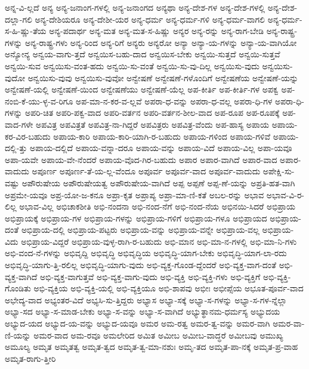 {ಅನ್ನ-ವಿ-ಲ್ಲದೆ
ಅನ್ಯ
ಅನ್ಯ-ಜನಾಂಗ-ಗಳಲ್ಲಿ
ಅನ್ಯ-ಜನಾಂಗದ
ಅನ್ಯಥಾ
ಅನ್ಯ-ದೇಶ-ಗಳ
ಅನ್ಯ-ದೇಶ-ಗಳಲ್ಲಿ
ಅನ್ಯ-ದೇಶ-ದಲ್ಲಾ-ಗಲಿ
ಅನ್ಯ-ದೇಶಿಯರೂ
ಅನ್ಯ-ದೇಶೀ-ಯರ
ಅನ್ಯ-ಧರ್ಮ
ಅನ್ಯ-ಧರ್ಮ-ಗಳಿ
ಅನ್ಯ-ಧರ್ಮ-ವಾಗಲಿ
ಅನ್ಯ-ಧರ್ಮ-ಸ-ಹಿ-ಷ್ಣು-ತೆಯ
ಅನ್ಯ-ಪದಾರ್ಥ
ಅನ್ಯ-ಮತ
ಅನ್ಯ-ಮತ-ಸ-ಹಿಷ್ಣು
ಅನ್ಯರ
ಅನ್ಯ-ರನ್ನು
ಅನ್ಯ-ರಾಗ-ಬೇಡಿ
ಅನ್ಯ-ರಾಷ್ಟ್ರ-ಗಳನ್ನು
ಅನ್ಯ-ರಾಷ್ಟ್ರ-ಗಳು
ಅನ್ಯ-ರಿಂದ
ಅನ್ಯ-ರಿಗೆ
ಅನ್ಯರು
ಅನ್ಯರೋ
ಅನ್ಯಾ
ಅನ್ಯಾ-ಯ-ಗಳನ್ನು
ಅನ್ಯಾ-ಯ-ವಾಗಿಯೋ
ಅನ್ಯೋನ್ಯ
ಅನ್ವಯ-ವಾಗು-ತ್ತದೆ
ಅನ್ವಯಿಸ-ಬಹು-ದಾದ
ಅನ್ವಯಿಸ-ಬೇಕು
ಅನ್ವಯಿ-ಸುತ್ತದೆ
ಅನ್ವಯಿ-ಸುತ್ತವೆ
ಅನ್ವಯಿ-ಸುವ
ಅನ್ವಯಿಸು-ವಂತ-ಹದು
ಅನ್ವಯಿ-ಸು-ವಂತೆ
ಅನ್ವಯಿ-ಸು-ವು-ದಿಲ್ಲ
ಅನ್ವಯಿಸು-ವುದು
ಅನ್ವಯಿಸು-ವುದೋ
ಅನ್ವಯಿಸು-ವುವು
ಅನ್ವಯಿಸು-ವುವೋ
ಅನ್ವೇಷಣೆ
ಅನ್ವೇಷಣೆ-ಗಳೊಂದಿಗೆ
ಅನ್ವೇಷಣೆಯ
ಅನ್ವೇಷಣೆ-ಯನ್ನು
ಅನ್ವೇಷಣೆ-ಯಲ್ಲಿ
ಅನ್ವೇಷಣೆ-ಯಿಂದ
ಅನ್ವೇಷಣೆಯು
ಅನ್ವೇಷಣೆ-ಯೆಲ್ಲ
ಅಪ-ಕೀರ್ತಿ
ಅಪ-ಕೀರ್ತಿ-ಗಳ
ಅಪಕ್ವ
ಅಪ-ನಂಬಿ-ಕೆ-ಯು-ಳ್ಳ-ವ-ರಿಗೂ
ಅಪ-ಮಾ-ನ-ಕರ-ವ-ಲ್ಲವೆ
ಅಪರಾ-ಧ-ವನ್ನು
ಅಪರಾ-ಧ-ವಲ್ಲ
ಅಪರಾ-ಧಿ-ಗಳ
ಅಪರಾ-ಧಿ-ಗಳನ್ನು
ಅಪರಿ-ಚಿತ
ಅಪರಿ-ಪಕ್ವ-ವಾದ
ಅಪರಿ-ವರ್ತನ
ಅಪರಿ-ವರ್ತನ-ಶೀಲ-ವಾದ
ಅಪ-ರೂಪ
ಅಪ-ರೂಪಕ್ಕೆ
ಅಪ-ವಾದ-ಗಳೇ
ಅಪವಿತ್ರ
ಅಪವಿತ್ರತೆ
ಅಪವಿತ್ರ-ನಾ-ಗಿದ್ದರೆ
ಅಪವಿತ್ರರು
ಅಪವಿತ್ರ-ವೆಂದು
ಅಪ-ಹಾಸ್ಯ
ಅಪಾಯ
ಅಪಾಯ-ಕರ-ವಿರ-ಬಹುದು
ಅಪಾಯ-ಕಾರಿ
ಅಪಾಯ-ಕಾರಿ-ಯಾಗಿ-ರ-ಬಹುದು
ಅಪಾಯ-ಗಳಿಂದ
ಅಪಾಯ-ಗಳಿವೆ
ಅಪಾಯ-ದಲ್ಲಿ-ತ್ತು
ಅಪಾಯ-ದಲ್ಲಿದೆ
ಅಪಾಯ-ವನ್ನಾ-ದರೂ
ಅಪಾಯ-ವನ್ನು
ಅಪಾಯ-ವಿದೆ
ಅಪಾಯ-ವಿಲ್ಲ
ಅಪಾ-ಯವೂ
ಅಪಾ-ಯವೇ
ಅಪಾಯ-ವೇ-ನೆಂದರೆ
ಅಪಾಯ-ವೊದ-ಗಿರ-ಬಹುದು
ಅಪಾರ
ಅಪಾರ-ವಾಗಿದೆ
ಅಪಾರ-ವಾದ
ಅಪಾರ-ವಾದುದು
ಅಪೂರ್ಣ
ಅಪೂರ್ಣ-ತೆ-ಯ-ಲ್ಲ-ವೆಂದೂ
ಅಪೂರ್ವ
ಅಪೂರ್ವ-ವಾದ
ಅಪೂರ್ವ-ವಾದುದು
ಅಪೇಕ್ಷಿ-ಸು-ವಷ್ಟು
ಅಪೌರುಷೇಯ
ಅಪೌರುಷೇಯತ್ವ
ಅಪೌರುಷೇಯ-ವಾಗಿದೆ
ಅಪ್ಪ
ಅಪ್ಪಣೆ
ಅಪ್ಪ-ಣೆ-ಯನ್ನು
ಅಪ್ರತಿ-ಹತ-ವಾಗಿ
ಅಪ್ರಮೇ-ಯವೂ
ಅಪ್ರ-ಯೋ-ಜ-ಕನೂ
ಅಪ್ರಾ-ಕೃತ
ಅಪ್ರಾಪ್ಯ
ಅಪ್ರಾ-ಮಾ-ಣಿ-ಕತೆ
ಅಬಲ-ರನ್ನು
ಅಭಾವ
ಅಭಾವ-ವಿ-ರ-ಲಿಲ್ಲ
ಅಭಾವ-ವಿಲ್ಲ
ಅಭಿಚಾಕಶೀತಿ
ಅಭಿ-ನಂದನಾ
ಅಭಿ-ನಂದ-ನೆಗೆ
ಅಭಿ-ನಂದ-ನೆಯ
ಅಭಿನಯಿ-ಸಿದರೆ
ಅಭಿಪ್ರಾಯ
ಅಭಿಪ್ರಾಯಕ್ಕೆ
ಅಭಿಪ್ರಾಯ-ಗಳ
ಅಭಿಪ್ರಾಯ-ಗಳನ್ನು
ಅಭಿಪ್ರಾಯ-ಗಳಿಗೆ
ಅಭಿಪ್ರಾಯ-ಗಳೂ
ಅಭಿಪ್ರಾಯದ
ಅಭಿಪ್ರಾಯ-ದಂತೆ
ಅಭಿಪ್ರಾಯ-ದಲ್ಲಿ
ಅಭಿಪ್ರಾಯ-ಪಟ್ಟರು
ಅಭಿಪ್ರಾಯ-ವನ್ನು
ಅಭಿಪ್ರಾಯ-ವನ್ನೇ
ಅಭಿಪ್ರಾಯ-ವಲ್ಲ
ಅಭಿಪ್ರಾಯ-ವಿದು
ಅಭಿಪ್ರಾಯ-ವಿದ್ದರೆ
ಅಭಿಪ್ರಾಯ-ವುಳ್ಳ-ರಾಗಿ-ರ-ಬಹುದು
ಅಭಿ-ಮಾನ
ಅಭಿ-ಮಾ-ನ-ಗಳಲ್ಲಿ
ಅಭಿ-ಮಾ-ನಿ-ಗಳು
ಅಭಿ-ವಂದ-ನೆ-ಗಳನ್ನು
ಅಭಿವೃದ್ದಿ
ಅಭಿವೃದ್ಧಿ
ಅಭಿವೃದ್ಧಿಯ
ಅಭಿವೃದ್ಧಿ-ಯಾಗ-ಬೇಕು
ಅಭಿವೃದ್ಧಿ-ಯಾಗ-ಲಾ-ರದು
ಅಭಿವೃದ್ಧಿ-ಯಾಗು-ತ್ತಿ-ರಲಿಲ್ಲ
ಅಭಿವೃದ್ಧಿ-ಯಾಗು-ವುದು
ಅಭಿ-ವ್ಯಕ್ತ-ಗೊಂಡ-ದ್ದೆಂದರೆ
ಅಭಿ-ವ್ಯಕ್ತ-ವಾಗ-ದಂತೆ
ಅಭಿ-ವ್ಯಕ್ತ-ವಾಗಿದೆ
ಅಭಿ-ವ್ಯಕ್ತ-ವಾಗುತ್ತವೆ
ಅಭಿ-ವ್ಯಕ್ತ-ವಾಗು-ವುದು
ಅಭಿ-ವ್ಯಕ್ತಿ
ಅಭಿ-ವ್ಯಕ್ತಿ-ಗಳು
ಅಭಿ-ವ್ಯಕ್ತಿಗೆ
ಅಭಿ-ವ್ಯಕ್ತಿ-ಗೊಂಡಿತು
ಅಭಿ-ವ್ಯಕ್ತಿಯ
ಅಭಿ-ವ್ಯಕ್ತಿ-ಯಲ್ಲಿ
ಅಭಿ-ವ್ಯಕ್ತಿಯೂ
ಅಭಿ-ಶಾಪವು
ಅಭೀಃ
ಅಭೀಪ್ಸೆಯ
ಅಭೂತ-ಪೂರ್ವ-ವಾದ
ಅಭೇದ್ಯ-ವಾದ
ಅಭ್ಯಂತರ-ವಿದೆ
ಅಭ್ಯಸಿ-ಸು-ತ್ತಿದ್ದರು
ಅಭ್ಯಾಸ
ಅಭ್ಯಾ-ಸಕ್ಕೆ
ಅಭ್ಯಾ-ಸ-ಗಳನ್ನು
ಅಭ್ಯಾ-ಸ-ಗಳ-ನ್ನೆಲ್ಲಾ
ಅಭ್ಯಾ-ಸದ
ಅಭ್ಯಾ-ಸ-ಮಾಡ-ಬೇಕು
ಅಭ್ಯಾ-ಸ-ವನ್ನು
ಅಭ್ಯಾ-ಸ-ವಾಗಿದೆ
ಅಭ್ಯುತ್ಥಾನಮ-ಧರ್ಮಸ್ಯ
ಅಭ್ಯುದಯ
ಅಭ್ಯುದ-ಯದ
ಅಭ್ಯುದ-ಯ-ವನ್ನು
ಅಭ್ಯುದ-ಯವೂ
ಅಮರ
ಅಮ-ರತ್ವ
ಅಮರ-ತ್ವ-ವನ್ನು
ಅಮರ-ವಾಗಿ
ಅಮರ-ವಾ-ಣಿ-ಯನ್ನು
ಅಮರ-ವಾದ
ಅಮ-ರವೂ
ಅಮಲೇರಿದ
ಅಮಿತ
ಅಮೀಬ
ಅಮೀಬ-ವಾದ್ಧರೆ
ಅಮೀಬವು
ಅಮುಖ್ಯ
ಅಮೂಲ್ಯ
ಅಮೃತ
ಅಮೃತತ್ವ
ಅಮೃತ-ತ್ವದ
ಅಮೃತ-ತ್ವ-ಮಾ-ನಶುಃ
ಅಮೃ-ತದ
ಅಮೃತ-ಪಾ-ನಕ್ಕೆ
ಅಮೃತ-ಪ್ರ-ವಾಹ
ಅಮೃತ-ರಾಗು-ತ್ತೀರಿ
}

